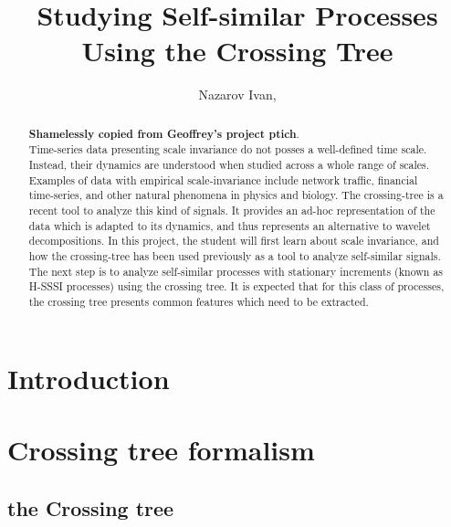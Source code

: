 \documentclass[a4paper]{report}
\title{Studying Self-similar Processes Using the Crossing Tree}
\author{Nazarov Ivan, \rus{101мНОД(ИССА)}}
\begin{document}

\clearpage


\clearpage

\maketitle
\begin{abstract}
\textbf{Shamelessly copied from Geoffrey's project ptich}.\hfill \\
Time-series data presenting scale invariance do not posses a well-defined time scale.
Instead, their dynamics are understood when studied across a whole range of scales.
Examples of data with empirical scale-invariance include network traffic, financial
time-series, and other natural phenomena in physics and biology. The crossing-tree
is a recent tool to analyze this kind of signals. It provides an ad-hoc representation
of the data which is adapted to its dynamics, and thus represents an alternative to
wavelet decompositions. In this project, the student will first learn about scale
invariance, and how the crossing-tree has been used previously as a tool to analyze
self-similar signals. The next step is to analyze self-similar processes with stationary
increments (known as H-SSSI processes) using the crossing tree. It is expected that
for this class of processes, the crossing tree presents common features which need
to be extracted.
\end{abstract}

\tableofcontents
\clearpage
{}


\chapter*{Introduction} %
\label{cha:introduction}


\chapter{Crossing tree formalism} %
\label{cha:crossing_tree_formalism}

\section{the Crossing tree} %
\label{sec:the_crossing_tree}
\end{document}

